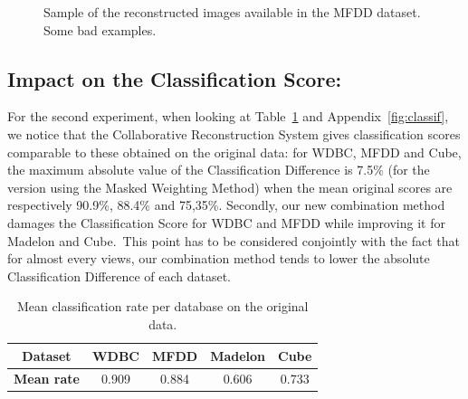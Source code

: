 \begin{figure}[H]
    \caption{Sample of the reconstructed images available in the MFDD dataset. Some bad examples.}
\label{fig:num_reconstructed_bad}
\end{figure}

    \subsection{Impact on the Classification Score:}
\label{sec:classif}

    For the second experiment, when looking at Table~\ref{table_classif} and Appendix~\ref{fig:classif}, we notice that the Collaborative Reconstruction System gives classification scores comparable to these obtained on the original data: for WDBC, MFDD and Cube, the maximum absolute value of the Classification Difference is 7.5\% (for the version using the Masked Weighting Method) when the mean original scores are respectively 90.9\%, 88.4\% and 75,35\%. Secondly, our new combination method damages the Classification Score for WDBC and MFDD while improving it for Madelon and Cube.\ This point has to be considered conjointly with the fact that for almost every views, our combination method tends to lower the absolute Classification Difference of each dataset.
	
\begin{table}[h]
    \centering
    \caption{Mean classification rate per database on the original data.}
\label{table_classif}
\begin{tabular}{ccccc}
\midrule
\textbf{Dataset}   & \parbox[c]{1.75cm}{\centering WDBC}  & \parbox[c]{1.75cm}{\centering MFDD}  & \parbox[c]{1.75cm}{\centering Madelon} & \parbox[c]{1.75cm}{\centering Cube}  \\ \midrule
\textbf{Mean rate} & 0.909 & 0.884 & 0.606   & 0.733 \\ \midrule
\end{tabular}
\end{table}

